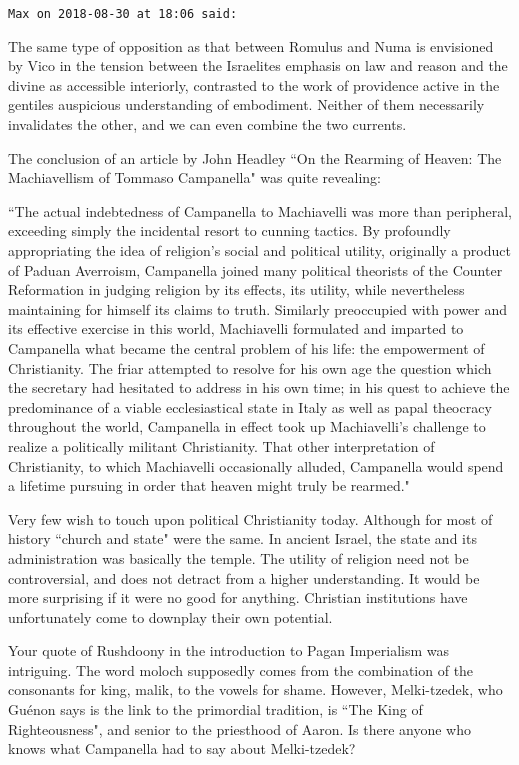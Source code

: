 \begin{footnotesize}\begin{sffamily}



\texttt{Max on 2018-08-30 at 18:06 said: }

The same type of opposition as that between Romulus and Numa is envisioned by Vico in the tension between the Israelites emphasis on law and reason and the divine as accessible interiorly, contrasted to the work of providence active in the gentiles auspicious understanding of embodiment. Neither of them necessarily invalidates the other, and we can even combine the two currents.

The conclusion of an article by John Headley ``On the Rearming of Heaven: The Machiavellism of Tommaso Campanella" was quite revealing:

``The actual indebtedness of Campanella to Machiavelli was more than peripheral, exceeding simply the incidental resort to cunning tactics. By profoundly appropriating the idea of religion's social and political utility, originally a product of Paduan Averroism, Campanella joined many political theorists of the Counter Reformation in judging religion by its effects, its utility, while nevertheless maintaining for himself its claims to truth. Similarly preoccupied with power and its effective exercise in this world, Machiavelli formulated and imparted to Campanella what became the central problem of his life: the empowerment of Christianity. The friar attempted to resolve for his own age the question which the secretary had hesitated to address in his own time; in his quest to achieve the predominance of a viable ecclesiastical state in Italy as well as papal theocracy throughout the world, Campanella in effect took up Machiavelli's challenge to realize a politically militant Christianity. That other interpretation of Christianity, to which Machiavelli occasionally alluded, Campanella would spend a lifetime pursuing in order that heaven might truly be rearmed."

Very few wish to touch upon political Christianity today. Although for most of history ``church and state" were the same. In ancient Israel, the state and its administration was basically the temple. The utility of religion need not be controversial, and does not detract from a higher understanding. It would be more surprising if it were no good for anything. Christian institutions have unfortunately come to downplay their own potential.

Your quote of Rushdoony in the introduction to Pagan Imperialism was intriguing. The word moloch supposedly comes from the combination of the consonants for king, malik, to the vowels for shame. However, Melki-tzedek, who Guénon says is the link to the primordial tradition, is ``The King of Righteousness", and senior to the priesthood of Aaron. Is there anyone who knows what Campanella had to say about Melki-tzedek?


\end{sffamily}
\end{footnotesize}
